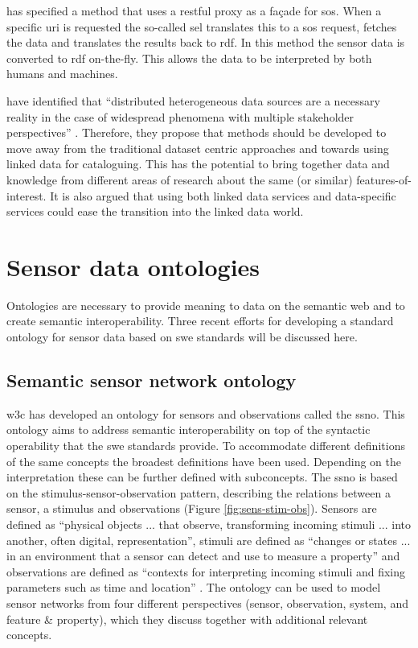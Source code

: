 \cite{SSW:Janowicz} has specified a method that uses a \ac{rest}ful proxy as a fa\c{c}ade for \ac{sos}. When a specific \ac{uri} is requested the so-called \ac{sel} translates this to a \ac{sos} request, fetches the data and translates the results back to \ac{rdf}. In this method the sensor data is converted to \ac{rdf} on-the-fly. This allows the data to be interpreted by both humans and machines.  

\cite{SSW:Atkinson} have identified that \enquote{distributed heterogeneous data sources are a necessary reality in the case of widespread phenomena with multiple stakeholder perspectives} \cite[p.129]{SSW:Atkinson}. Therefore, they propose that methods should be developed to move away from the traditional dataset centric approaches and towards using linked data for cataloguing. This has the potential to bring together data and knowledge from different areas of research about the same (or similar) features-of-interest. It is also argued that using both linked data services and data-specific services could ease the transition into the linked data world.  

\section{Sensor data ontologies}

Ontologies are necessary to provide meaning to data on the semantic web and to create semantic interoperability. Three recent efforts for developing a standard ontology for sensor data based on \ac{swe} standards will be discussed here.

\subsection{Semantic sensor network ontology} 
\ac{w3c} has developed an ontology for sensors and observations called the \ac{ssno}. This ontology aims to address semantic interoperability on top of the syntactic operability that the \ac{swe} standards provide. To accommodate different definitions of the same concepts the broadest definitions have been used. Depending on the interpretation these can be further defined with subconcepts. The \ac{ssno} is based on the stimulus-sensor-observation pattern, describing the relations between a sensor, a stimulus and observations (Figure \ref{fig:sens-stim-obs}). Sensors are defined as \enquote{physical objects ... that observe, transforming incoming stimuli ... into another, often digital, representation}, stimuli are defined as \enquote{changes or states ... in an environment that a sensor can detect and use to measure a property} and observations are defined as \enquote{contexts for interpreting incoming stimuli and fixing parameters such as time and location} \cite[p. 28]{SSW:SSN_incubatorGroup}. The ontology can be used to model sensor networks from four different perspectives (sensor, observation, system, and feature \& property), which they discuss together with additional relevant concepts.

